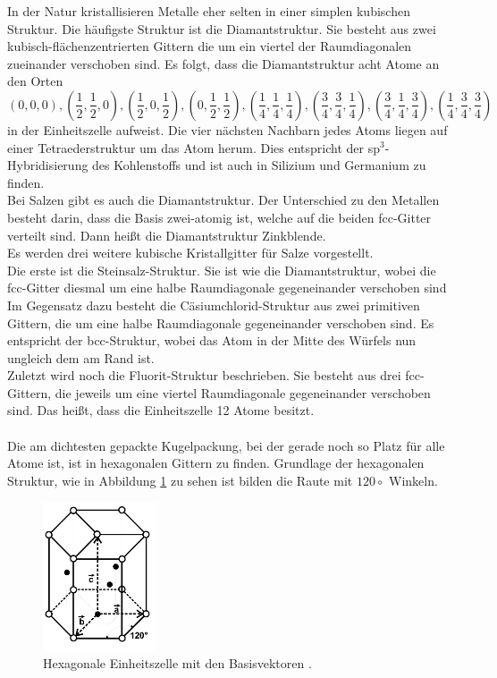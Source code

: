 In der Natur kristallisieren Metalle eher selten in einer simplen kubischen Struktur. 
Die häufigste Struktur ist die Diamantstruktur. 
Sie besteht aus  zwei kubisch-flächenzentrierten Gittern die um ein viertel der Raumdiagonalen zueinander verschoben sind. 
Es folgt, dass die Diamantstruktur acht Atome an den Orten
\begin{equation}
(0,0,0), \left(\frac{1}{2}, \frac{1}{2}, 0 \right), \left(\frac{1}{2}, 0, \frac{1}{2} \right), \left(0, \frac{1}{2}, \frac{1}{2} \right), \left(\frac{1}{4}, \frac{1}{4}, \frac{1}{4} \right), \left(\frac{3}{4}, \frac{3}{4}, \frac{1}{4} \right), \left(\frac{3}{4}, \frac{1}{4}, \frac{3}{4} \right),  \left(\frac{1}{4}, \frac{3}{4}, \frac{3}{4} \right)
\end{equation}
in der Einheitszelle aufweist.
Die vier nächsten Nachbarn jedes Atoms liegen auf einer Tetraederstruktur um das Atom herum.
Dies entspricht der sp$^3$-Hybridisierung des Kohlenstoffs und ist auch in Silizium und Germanium zu finden.\\
Bei Salzen gibt es auch die Diamantstruktur.
Der Unterschied zu den Metallen besteht darin, dass die Basis zwei-atomig ist, welche auf die beiden fcc-Gitter verteilt sind.
Dann heißt die Diamantstruktur Zinkblende.\\
Es werden drei weitere kubische Kristallgitter für Salze vorgestellt.\\
Die erste ist die Steinsalz-Struktur. 
Sie ist wie die Diamantstruktur, wobei die fcc-Gitter diesmal um eine halbe Raumdiagonale gegeneinander verschoben sind\\
Im Gegensatz dazu besteht die Cäsiumchlorid-Struktur aus zwei primitiven Gittern, die um eine halbe Raumdiagonale gegeneinander verschoben sind. 
Es entspricht der bcc-Struktur, wobei das Atom in der Mitte des Würfels nun ungleich dem am Rand ist.\\
Zuletzt wird noch die Fluorit-Struktur beschrieben.
Sie besteht aus drei fcc-Gittern, die jeweils um eine viertel Raumdiagonale gegeneinander verschoben sind. 
Das heißt, dass die Einheitszelle 12 Atome besitzt.\\\\
Die am dichtesten gepackte Kugelpackung, bei der gerade noch so Platz für alle Atome ist, ist in hexagonalen Gittern zu finden. 
Grundlage der hexagonalen Struktur, wie in Abbildung \ref{fig:hexagonal} zu sehen ist bilden die Raute mit $120\circ$  Winkeln.
\begin{figure}[h]
	\centering
	\includegraphics[width = 0.3\textwidth]{Abbildungen/hexagonal.png}
	\caption{Hexagonale Einheitszelle mit den Basisvektoren \cite{Anleitung}. }
	\label{fig:hexagonal}
\end{figure} 
